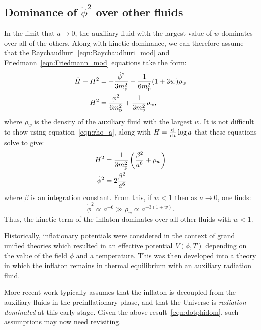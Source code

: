 \subsection{Dominance of $\dot{\phi}^2$ over other fluids}
\label{sec:dominance_fluids}
In the limit that $a\to 0$, the auxiliary fluid with the largest value of $w$ dominates over all of the others. Along with kinetic dominance, we can therefore assume that the Raychaudhuri~\eqref{eqn:Raychaudhuri_mod} and Friedmann~\eqref{eqn:Friedmann_mod} equations take the form:
%
\begin{align}
  \dot{H}+H^2 
  &= 
  -\frac{\dot{\phi}^2}{3m_{\mathrm{p}}^2} - \frac{1}{6m_{\mathrm{p}}^2}(1+3w)\rho_w
  \label{eqn:Ray_KD_eq_rho}
  \\
  H^2 
  &= 
  \frac{\dot{\phi}^2}{6m_{\mathrm{p}}^2} +  \frac{1}{3m_{\mathrm{p}}^2}\rho_w,
  \label{eqn:Friedmann_KD_eq_rho}
\end{align}
where $\rho_w$ is the density of the auxiliary fluid with the largest $w$.  It is not difficult to show using equation~\eqref{eqn:rho_a},
along with $H=\frac{\operatorname{d}^{}\!{}}{\operatorname{d}^{}\!{t}}\log a$ that these equations solve to give:
%
\begin{align}
  H^2 
  &= 
  \frac{1}{3m_{\mathrm{p}}^2}\left(\frac{\beta^2}{a^6} + \rho_w\right) 
  \label{eqn:H_of_a_1}
  \\
  \dot{\phi}^2 
  &= 
  2\frac{\beta^2}{a^6} 
  \label{eqn:dotphi_of_a_1}
\end{align}
%
where $\beta$ is an integration constant. From this, if $w<1$ then as
$a\to 0$, one finds:
%
\begin{equation}
  \dot{\phi}^2 \propto a^{-6} 
  \gg
  \rho_w \propto a^{-3(1+w)}.
  \label{eqn:dotphidom}
\end{equation}
%
Thus, the kinetic term of the inflaton dominates over all other fluids with $w<1$.




Historically, inflationary potentials were considered in the context of grand unified theories \citep{PhysRevLett.48.1220,linde_1982} which resulted in an effective potential $V(\phi,T)$ depending on the value of the field $\phi$ and a temperature.  This was then developed \citep{1995PhRvL..74.1912B,PhysRevLett.75.3218} into a theory in which the inflaton remains in thermal equilibrium with an auxiliary radiation fluid.

More recent work \citep{2007PhRvD..76f3512P} typically assumes that the inflaton is decoupled from the auxiliary fluids in the preinflationary phase, and that the Universe is {\em radiation dominated\/} at this early stage. Given the above result~\eqref{eqn:dotphidom}, such assumptions may now need revisiting.



